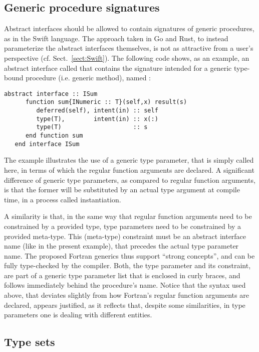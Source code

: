 \documentclass[11pt,oneside]{report}
\newcommand{\code}[1]{{\selectfont\ttfamily{#1}}}
\begin{document}
\subsection{Generic procedure signatures} 
\label{sect:generic_interfaces}

Abstract interfaces should be allowed to contain signatures of generic
procedures, as in the Swift language. The approach taken in Go and
Rust, to instead parameterize the abstract interfaces themselves, is
not as attractive from a user's perspective
(cf. Sect.~\ref{sect:Swift}). The following code shows, as an example,
an abstract interface called \code{ISum} that contains the signature
intended for a generic type-bound procedure (i.e. generic method),
named \code{sum}:
\begin{lstlisting}[language=LFortran,style=boxed]
   abstract interface :: ISum
      function sum{INumeric :: T}(self,x) result(s)
         deferred(self), intent(in) :: self
         type(T),        intent(in) :: x(:)
         type(T)                    :: s
      end function sum
   end interface ISum
\end{lstlisting}

The example illustrates the use of a generic type parameter, that is
simply called \code{T} here, in terms of which the regular function
arguments are declared. A significant difference of generic type
parameters, as compared to regular function arguments, is that the
former will be substituted by an actual type argument at compile time,
in a process called instantiation.

A similarity is that, in the same way that regular function arguments
need to be constrained by a provided type, type parameters need to be
constrained by a provided meta-type. This (meta-type) constraint must
be an abstract interface name (like \code{INumeric} in the present
example), that precedes the actual type parameter name. The proposed
Fortran generics thus support ``strong concepts'', and can be fully
type-checked by the compiler. Both, the type parameter and its
constraint, are part of a generic type parameter list that is enclosed
in curly braces, and follows immediately behind the procedure's
name. Notice that the syntax used above, that deviates slightly from
how Fortran's regular function arguments are declared, appears
justified, as it reflects that, despite some similarities, in type
parameters one is dealing with different entities.

\subsection{Type sets}
\label{sect:type_sets}
\end{document}

